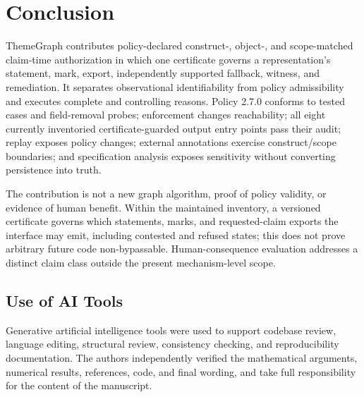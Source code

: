 \documentclass[manuscript,screen,review]{acmart}
\begin{document}
\section{Conclusion}

ThemeGraph contributes policy-declared construct-, object-, and scope-matched claim-time authorization in which one certificate governs a representation's statement, mark, export, independently supported fallback, witness, and remediation. It separates observational identifiability from policy admissibility and executes complete and controlling reasons. Policy 2.7.0 conforms to tested cases and field-removal probes; enforcement changes reachability; all eight currently inventoried certificate-guarded output entry points pass their audit; replay exposes policy changes; external annotations exercise construct/scope boundaries; and specification analysis exposes sensitivity without converting persistence into truth.

The contribution is not a new graph algorithm, proof of policy validity, or evidence of human benefit. Within the maintained inventory, a versioned certificate governs which statements, marks, and requested-claim exports the interface may emit, including contested and refused states; this does not prove arbitrary future code non-bypassable. Human-consequence evaluation addresses a distinct claim class outside the present mechanism-level scope.

\subsection{Use of AI Tools}

Generative artificial intelligence tools were used to support codebase review, language editing, structural review, consistency checking, and reproducibility documentation. The authors independently verified the mathematical arguments, numerical results, references, code, and final wording, and take full responsibility for the content of the manuscript.



\end{document}
